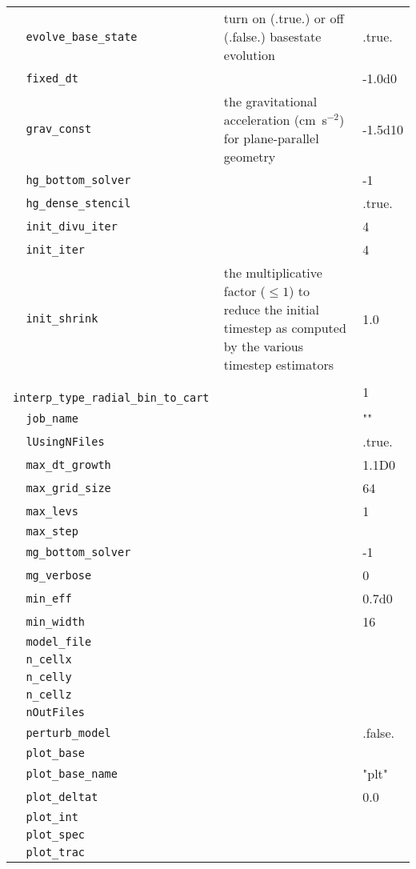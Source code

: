 {\begin{center}
\begin{longtable}{|l|p{3.25in}|l|}
\verb=  evolve_base_state =  & turn on (.true.) or off (.false.) basestate evolution  &  .true. \\
\verb=  fixed_dt =  &   &  -1.0d0 \\
\verb=  grav_const =  & the gravitational acceleration (cm~s$^{-2}$) for plane-parallel geometry  &  -1.5d10 \\
\verb=  hg_bottom_solver =  &   &  -1 \\
\verb=  hg_dense_stencil =  &   &  .true. \\
\verb=  init_divu_iter =  &   &  4 \\
\verb=  init_iter =  &   &  4 \\
\verb=  init_shrink =  & the multiplicative factor ($\le 1$) to reduce the initial timestep as computed by the various timestep estimators   &  1.0 \\
\verb=  interp_type_radial_bin_to_cart =  &   &  1 \\
\verb=  job_name =  &   &  "" \\
\verb=  lUsingNFiles =  &   &  .true. \\
\verb=  max_dt_growth =  &   &  1.1D0 \\
\verb=  max_grid_size =  &   &  64 \\
\verb=  max_levs =  &   &  1 \\
\verb=  max_step =  &   &  \\
\verb=  mg_bottom_solver =  &   &  -1 \\
\verb=  mg_verbose =  &   &  0 \\
\verb=  min_eff =  &   &  0.7d0 \\
\verb=  min_width =  &   &  16 \\
\verb=  model_file =  &   &  \\
\verb=  n_cellx =  &   &  \\
\verb=  n_celly =  &   &  \\
\verb=  n_cellz =  &   &  \\
\verb=  nOutFiles =  &   &  \\
\verb=  perturb_model =  &   &  .false. \\
\verb=  plot_base =  &   &  \\
\verb=  plot_base_name =  &   &  "plt" \\
\verb=  plot_deltat =  &   &  0.0 \\
\verb=  plot_int =  &   &  \\
\verb=  plot_spec =  &   &  \\
\verb=  plot_trac =  &   &  \\

\end{longtable}
\end{center}}
